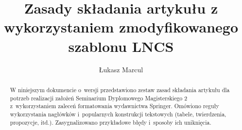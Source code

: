 

\title{Zasady składania artykułu z wykorzystaniem zmodyfikowanego szablonu LNCS}
\author{Łukasz Marcul}



\maketitle

\begin{abstract}
	W niniejszym dokumencie o~wersji przedstawiono zestaw zasad składania artykułu dla potrzeb realizacji założeń Seminarium Dyplomowego Magisterskiego 2 z~wykorzystaniem zaleceń formatowania wydawnictwa Springer. Omówiono reguły wykorzystania nagłówków i~popularnych konstrukcji tekstowych (tabele, twierdzenia, propozycje, itd.). Zasygnalizowano przykładowe błędy i~sposoby ich uniknięcia.

\end{abstract}







